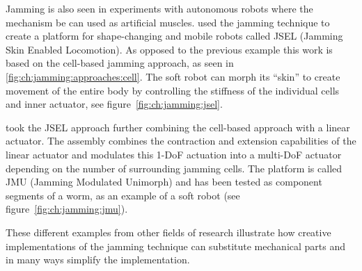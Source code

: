 Jamming is also seen in experiments with autonomous robots where the mechanism be can used as artificial muscles.
\citet{steltz2009jsel} used the jamming technique to create a platform for shape-changing and mobile robots called JSEL (Jamming Skin Enabled Locomotion).
As opposed to the previous example this work is based on the cell-based jamming approach, as seen in \ref{fig:ch:jamming:approaches:cell}.
The soft robot can morph its ``skin'' to create movement of the entire body by controlling the stiffness of the individual cells and inner actuator, see figure~\ref{fig:ch:jamming:jsel}. 

\citet{steltz2010jamming} took the JSEL approach further combining the cell-based approach with a linear actuator. 
The assembly combines the contraction and extension capabilities of the linear actuator and modulates this 1-DoF actuation into a multi-DoF actuator depending on the number of surrounding jamming cells.
The platform is called JMU (Jamming Modulated Unimorph) and has been tested as component segments of a worm, as an example of a soft robot (see figure~\ref{fig:ch:jamming:jmu}).

These different examples from other fields of research illustrate how creative implementations of the jamming technique can substitute mechanical parts and in many ways simplify the implementation.

